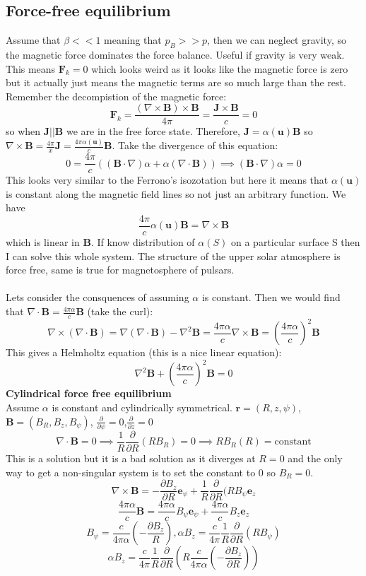 \documentclass{article}
\begin{document}
\subsection{Force-free equilibrium}
Assume that $\beta <<1$ meaning that $p_B >> p$, then we can neglect gravity, so the magnetic force dominates the force balance. Useful if gravity is very weak. This means $\bm F_k = 0$ which looks weird as it looks like the magnetic force is zero but it actually just means the magnetic terms are so much large than the rest. Remember the decompistion of the magnetic force:
$$
\bm F_k = \frac{(\nabla \times \bm B) \times \bm B}{4 \pi} = \frac{\bm J \times \bm B}{c} = 0
$$
so when $\bm J || \bm B$ we are in the free force state. Therefore, $\bm J = \alpha(\bm u)\bm B$ so $\nabla \times \bm B = \frac{4\pi}{x} \bm J = \frac{4 \pi \alpha(\bm u) }{c} \bm B$.
Take the divergence of this equation:
$$
0 = \frac{4\pi}{c}\left( ( \bm B \cdot \nabla) \alpha + \alpha (\nabla \cdot \bm B) \right) \implies (\bm B \cdot \nabla) \alpha = 0
$$
This looks very similar to the Ferrono's isozotation but here it means that $\alpha(\bm u)$ is constant along the magnetic field lines so not just an arbitrary function. We have
$$
\frac{4\pi}{c} \alpha(\bm u) \bm B = \nabla \times \bm B 
$$
which is linear in $\bm B$. If know distribution of $\alpha(S)$ on a particular surface S then I can solve this whole system. The structure of the upper solar atmosphere is force free, same is true for magnetosphere of pulsars. \\\\
Lets consider the consquences of assuming $\alpha$ is constant. Then we would find that $\nabla \cdot \bm B = \frac{4\pi \alpha}{c} \bm B$ (take the curl):
$$
\nabla \times(\nabla \cdot \bm B) = \nabla(\nabla \cdot \bm B) - \nabla^2 \bm B = \frac{4\pi \alpha}{c} \nabla \times \bm B = (\frac{4\pi \alpha}{c}) ^2\bm B 
$$
This gives a Helmholtz equation (this is a nice linear equation):
$$
\nabla^2 \bm B +  (\frac{4\pi \alpha}{c}) ^2\bm B = 0
$$
\textbf{Cylindrical force free equilibrium}\\
Assume $\alpha$ is constant and cylindrically symmetrical. $\bm r = ( R, z, \psi)$, $\bm B = (B_R, B_z, B_{\psi})$, $\frac{\partial}{\partial \psi} = 0$,$\frac{\partial}{\partial z} = 0$
$$
\nabla \cdot \bm B = 0 \implies \frac{1}{R}\frac{\partial}{\partial R} (R B_R) = 0 \implies RB_R(R) = \text{constant}
$$
This is a solution but it is a bad solution as it diverges at $R=0$ and the only way to get a non-singular system is to set the constant to 0 so $B_R =0$.\\
$$
\nabla \times \bm B = -\frac{\partial B_z}{\partial R}\bm e_{\psi} + \frac{1}{R} \frac{\partial}{\partial R}(RB_{\psi} \bm e_z
$$
$$
\frac{4\pi\alpha}{c}\bm B = \frac{4\pi\alpha}{c}B_{\psi}\bm e_{\psi} + \frac{4\pi\alpha}{c}B_z \bm e_z
$$
$$
B_{\psi} = \frac{c}{4\pi \alpha}(-\frac{\partial B_z}{R}), \alpha B_z = \frac{c}{4\pi} \frac{1}{R} \frac{\partial}{\partial R} (R B_{\psi})
$$
$$
\alpha B_z = \frac{c}{4\pi} \frac{1}{R} \frac{\partial}{\partial R} \left( R \frac{c}{4\pi \alpha} (-\frac{\partial B_z}{\partial R}) \right)
$$
\end{document}
